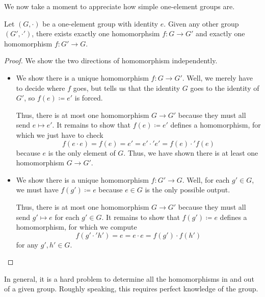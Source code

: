 \documentclass[../main.tex]{subfiles}
\begin{document}
We now take a moment to appreciate how simple one-element groups are.
\begin{proposition} \label{prop:trivial-homs}
    Let $(G,\cdot)$ be a one-element group with identity $e$. Given any other group $(G',\cdot')$, there exists exactly one homomorphsim $f\colon G\to G'$ and exactly one homomorphism $f\colon G'\to G$.
\end{proposition}
\begin{proof}
    We show the two directions of homomorphism independently.
    \begin{itemize}
        \item We show there is a unique homomorphism $f\colon G\to G'$. Well, we merely have to decide where $f$ goes, but  tells us that the identity $G$ goes to the identity of $G'$, so $f(e)\coloneqq e'$ is forced.
        
        Thus, there is at most one homomorphism $G\to G'$ because they must all send $e\mapsto e'$. It remains to show that $f(e)\coloneqq e'$ defines a homomorphism, for which we just have to check
        \[f(e\cdot e)=f(e)=e'=e'\cdot'e'=f(e)\cdot'f(e)\]
        because $e$ is the only element of $G$. Thus, we have shown there is at least one homomorphism $G\to G'$.
        
        \item We show there is a unique homomorphism $f\colon G'\to G$. Well, for each $g'\in G$, we must have $f(g')\coloneqq e$ because $e\in G$ is the only possible output.
        
        Thus, there is at most one homomorphism $G\to G'$ because they must all send $g'\mapsto e$ for each $g'\in G$. It remains to show that $f(g')\coloneqq e$ defines a homomorphism, for which we compute
        \[f(g'\cdot'h')=e=e\cdot e=f(g')\cdot f(h')\]
        for any $g',h'\in G$.
        \qedhere
    \end{itemize}
\end{proof}
In general, it is a hard problem to determine all the homomorphisms in and out of a given group. Roughly speaking, this requires perfect knowledge of the group.
\end{document}
